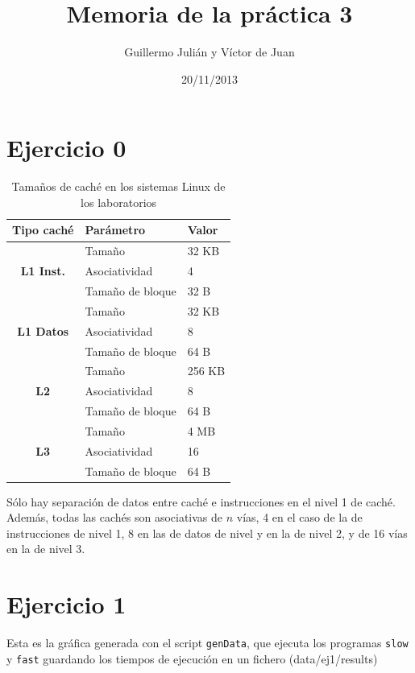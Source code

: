 \documentclass[nochap]{apuntes}
\title{Memoria de la práctica 3}
\author{Guillermo Julián y Víctor de Juan}
\date{20/11/2013}
\begin{document}
\pagestyle{plain}
\maketitle

\section*{Ejercicio 0}

\begin{table}[htbp]
\centering
\begin{tabular}{|c|l|l|}
\hline \textbf{Tipo caché} & \textbf{Parámetro} & \textbf{Valor}  \\ 
\hline \multirow{3}{*}{\textbf{L1 Inst.}} 	& Tamaño  			& 32 KB  \\ 
\cline{2-3}  								& Asociatividad 	& 4  \\ 
\cline{2-3}  								& Tamaño de bloque  & 32 B  \\ 
\hline \multirow{3}{*}{\textbf{L1 Datos}} 	& Tamaño  			& 32 KB  \\ 
\cline{2-3}  								& Asociatividad 	& 8  \\ 
\cline{2-3}  								& Tamaño de bloque  & 64 B  \\ 
\hline \multirow{3}{*}{\textbf{L2}}		 	& Tamaño  			& 256 KB  \\ 
\cline{2-3}  								& Asociatividad 	& 8  \\ 
\cline{2-3}  								& Tamaño de bloque  & 64 B  \\ 
\hline \multirow{3}{*}{\textbf{L3}}		 	& Tamaño  			& 4 MB  \\ 
\cline{2-3}  								& Asociatividad 	& 16 \\ 
\cline{2-3}  								& Tamaño de bloque  & 64 B  \\ 
\hline 
\end{tabular} 
\caption{Tamaños de caché en los sistemas Linux de los laboratorios}
\end{table}

Sólo hay separación de datos entre caché e instrucciones en el nivel 1 de caché. Además, todas las cachés son asociativas de $n$ vías, 4 en el caso de la de instrucciones de nivel 1, 8 en las de datos de nivel y en la de nivel 2, y de 16 vías en la de nivel 3.

\section*{Ejercicio 1}

Esta es la gráfica generada con el script \texttt{genData}, que ejecuta los programas \texttt{slow} y \texttt{fast} guardando los tiempos de ejecución en un fichero (data/ej1/results)
\end{document}
